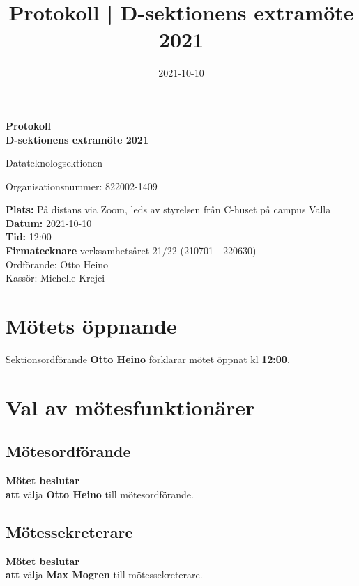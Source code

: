 \documentclass{datateknologsektionen-document}
\title{Protokoll | D-sektionens extramöte 2021}
\date{2021-10-10}
\newcommand{\ind}{\hspace*{2em}}
\newcommand{\motetbeslutar}{\textbf{Mötet beslutar}}
\newcommand{\att}{\\\ind\textbf{att}}
\begin{document}
\hspace{0pt}
\vfill
\begin{center}
    \Huge\textbf{Protokoll \\ D-sektionens extramöte 2021}

    \huge Datateknologsektionen

    \large
    Organisationsnummer: 822002-1409

\end{center}
\vfill
{\large
    \textbf{Plats:} På distans via Zoom, leds av styrelsen från C-huset på campus Valla \\
    \textbf{Datum:} 2021-10-10 \\
    \textbf{Tid:} 12:00 \\
    \textbf{Firmatecknare} verksamhetsåret 21/22 (210701 - 220630) \\
    \ind Ordförande: Otto Heino\\
    \ind Kassör: Michelle Krejci
}
\vfill
\hspace{0pt}
\pagebreak




\tableofcontents
\pagebreak





\section{Mötets öppnande}
Sektionsordförande \textbf{Otto Heino} förklarar mötet öppnat kl \textbf{12:00}.




\section{Val av mötesfunktionärer}
\subsection{Mötesordförande}
\motetbeslutar\att{} välja \textbf{Otto Heino} till mötesordförande.

\subsection{Mötessekreterare}
\motetbeslutar\att{} välja \textbf{Max Mogren} till mötessekreterare.
\end{document}
